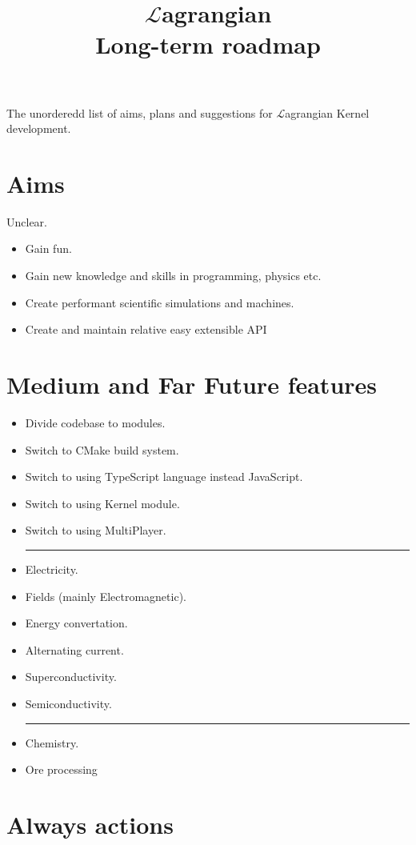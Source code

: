\documentclass[12pt]{article}
\title{$\mathcal{L}$agrangian \\ Long-term roadmap}
\begin{document}
	\maketitle

	The unorderedd list of aims, plans and suggestions for $\mathcal{L}$agrangian Kernel development.

	\section{Aims}
	Unclear.
	\begin{itemize}
		\item Gain fun.
		\item Gain new knowledge and skills in programming, physics etc.
		\item Create performant scientific simulations and machines.
		\item Create and maintain relative easy extensible API
	\end{itemize}

	\section{Medium and Far Future features}

	\begin{itemize}
		\item Divide codebase to modules.
		\item Switch to CMake build system.
		\item Switch to using TypeScript language instead JavaScript.
		\item Switch to using Kernel module.
		\item Switch to using MultiPlayer. \\
		\noindent\rule{\textwidth}{0.4pt}
		\item Electricity.
		\item Fields (mainly Electromagnetic).
		\item Energy convertation.
		\item Alternating current.
		\item Superconductivity.
		\item Semiconductivity. \\
		\noindent\rule{\textwidth}{0.4pt}
		\item Chemistry.
		\item Ore processing
	\end{itemize}

	\section{Always actions}
\end{document}
